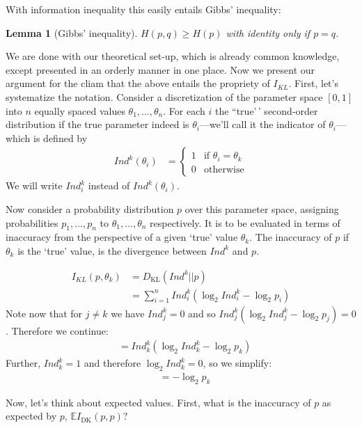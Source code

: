 \documentclass[
  letterpaper,
  DIV=11,
  numbers=noendperiod]{scrartcl}
\newtheorem{lemma}{Lemma}
\begin{document}
With information inequality this easily entails Gibbs' inequality:

\begin{lemma}[Gibbs' inequality] $H(p,q) \geq H(p)$ with identity only if $p = q$.
\end{lemma}

We are done with our theoretical set-up, which is already common
knowledge, except presented in an orderly manner in one place. Now we
present our argument for the cliam that the above entails the propriety
of \(I_{KL}\). First, let's systematize the notation. Consider a
discretization of the parameter space \([0,1]\) into \(n\) equally
spaced values \(\theta_1, \dots, \theta_n\). For each \(i\) the
``true'\,' second-order distribution if the true parameter indeed is
\(\theta_i\)---we'll call it the indicator of \(\theta_i\)--- which is
defined by \begin{align*}
Ind^k(\theta_i) & = \begin{cases} 1 & \mbox{if } \theta_i = \theta_k\\
                        0 & \mbox{otherwise}  \end{cases}
\end{align*} \noindent We will write \(Ind^k_i\) instead of
\(Ind^k(\theta_i)\).

Now consider a probability distribution \(p\) over this parameter space,
assigning probabilities \(p_1, \dots, p_n\) to
\(\theta_1, \dots, \theta_n\) respectively. It is to be evaluated in
terms of inaccuracy from the perspective of a given `true' value
\(\theta_k\). The inaccuracy of \(p\) if \(\theta_k\) is the `true'
value, is the divergence between \(Ind^k\) and \(p\).

\begin{align*}
I_{KL}(p, \theta_k) & = D_\text{KL}(Ind^k||p) \\
& = \sum_{i=1}^n Ind^k_i \left( \log_2 Ind^k_i - \log_2 p_i \right)
\end{align*} Note now that for \(j \neq k\) we have \(Ind^k_j = 0\) and
so \(Ind^k_j \left( \log_2 Ind^k_j - \log_2 p_j \right)=0\). Therefore
we continue: \begin{align*}
& = Ind^k_k \left( \log_2 Ind^k_k - \log_2 p_k \right)
\end{align*} Further, \(Ind^k_k= 1\) and therefore
\(\log_2 Ind^k_k =0\), so we simplify: \begin{align*}
& =  - \log_2 p_k
\end{align*}

\noindent Now, let's think about expected values. First, what is the
inaccuracy of \(p\) as expected by \(p\),
\(\mathbb{E}I_{\text{DK}}(p,p)\)?
\end{document}
